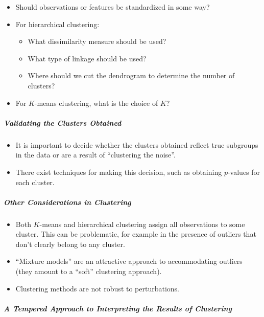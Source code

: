\documentclass[11pt]{article}
\providecommand{\tightlist}{%
      \setlength{\itemsep}{0pt}\setlength{\parskip}{0pt}}
\begin{document}
    \begin{itemize}
\tightlist
\item
  Should observations or features be standardized in some way?
\item
  For hierarchical clustering:

  \begin{itemize}
  \tightlist
  \item
    What dissimilarity measure should be used?
  \item
    What type of linkage should be used?
  \item
    Where should we cut the dendrogram to determine the number of
    clusters?
  \end{itemize}
\item
  For \(K\)-means clustering, what is the choice of \(K\)?
\end{itemize}

    \hypertarget{validating-the-clusters-obtained}{%
\subparagraph{Validating the Clusters
Obtained}\label{validating-the-clusters-obtained}}

    \begin{itemize}
\tightlist
\item
  It is important to decide whether the clusters obtained reflect true
  subgroups in the data or are a result of ``clustering the noise''.
\item
  There exist techniques for making this decision, such as obtaining
  \(p\)-values for each cluster.
\end{itemize}

    \hypertarget{other-considerations-in-clustering}{%
\subparagraph{Other Considerations in
Clustering}\label{other-considerations-in-clustering}}

    \begin{itemize}
\tightlist
\item
  Both \(K\)-means and hierarchical clustering assign all observations
  to some cluster. This can be problematic, for example in the presence
  of outliers that don't clearly belong to any cluster.
\item
  ``Mixture models'' are an attractive approach to accommodating
  outliers (they amount to a ``soft'' clustering approach).
\item
  Clustering methods are not robust to perturbations.
\end{itemize}

    \hypertarget{a-tempered-approach-to-interpreting-the-results-of-clustering}{%
\subparagraph{A Tempered Approach to Interpreting the Results of
Clustering}\label{a-tempered-approach-to-interpreting-the-results-of-clustering}}
\end{document}
